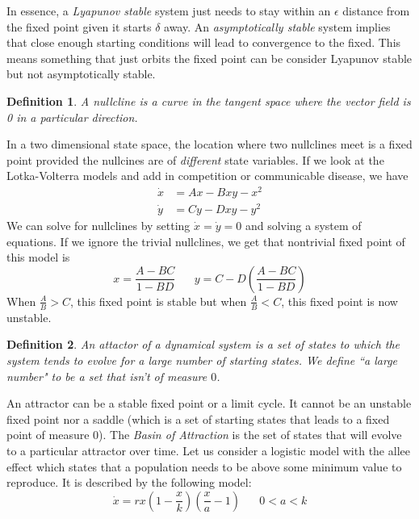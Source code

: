 \documentclass{article}
\newtheorem{definition}{Definition}[section]
\begin{document}
In essence, a \emph{Lyapunov stable} system just needs to stay within an $\epsilon$ distance from the fixed point given it starts $\delta$ away. An \emph{asymptotically stable} system implies that close enough starting conditions will lead to convergence to the fixed. This means something that just orbits the fixed point can be consider Lyapunov stable but not asymptotically stable.
\begin{definition}
    A \emph{nullcline} is a curve in the tangent space where the vector field is 0 in a particular direction.
\end{definition}
In a two dimensional state space, the location where two nullclines meet is a fixed point provided the nullcines are of \emph{different} state variables. If we look at the Lotka-Volterra models and add in competition or communicable disease, we have 
\begin{equation*}
    \begin{split}
        \dot x&=Ax-Bxy-x^2 \\
        \dot y&= Cy-Dxy-y^2
    \end{split}
\end{equation*}
We can solve for nullclines by setting $\dot x=\dot y=0$ and solving a system of equations. If we ignore the trivial nullclines, we get that nontrivial fixed point of this model is 
\begin{equation*}
    x=\frac{A-BC}{1-BD} \hspace{20pt} y=C-D\left(\frac{A-BC}{1-BD} \right)
\end{equation*}
When $\frac{A}{B}>C$, this fixed point is stable but when $\frac{A}{B}<C$, this fixed point is now unstable.
\begin{definition}
    An \emph{attactor} of a dynamical system is a set of states to which the system tends to evolve for a large number of starting states. We define ``a large number" to be a set that isn't of measure $0$.
\end{definition}
An attractor can be a stable fixed point or a limit cycle. It cannot be an unstable fixed point nor a saddle (which is a set of starting states that leads to a fixed point of measure 0). The \emph{Basin of Attraction} is the set of states that will evolve to a particular attractor over time. Let us consider a logistic model with the allee effect which states that a population needs to be above some minimum value to reproduce. It is described by the following model: 
\begin{equation*}
    \dot x =rx\left(1-\frac{x}{k}\right)\left(\frac{x}{a}-1\right) \hspace{20pt} 0<a<k
\end{equation*}
\end{document}
